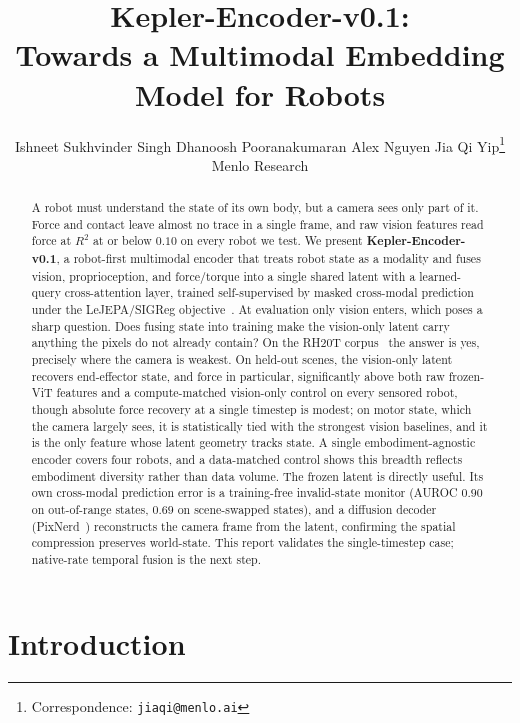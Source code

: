 \documentclass{article}
\title{Kepler-Encoder-v0.1:\\
       Towards a Multimodal Embedding Model for Robots}
\author{%
  Ishneet Sukhvinder Singh
  \And
  Dhanoosh Pooranakumaran
  \And
  Alex Nguyen
  \And
  Jia Qi Yip\thanks{Correspondence: \texttt{jiaqi@menlo.ai}} \\
  Menlo Research \\
}
\begin{document}
\maketitle


\begin{abstract}
  A robot must understand the state of its own body, but a camera sees only part of it. Force and contact leave almost no trace in a single frame, and raw vision features read force at $R^2$ at or below $0.10$ on every robot we test. We present \textbf{Kepler-Encoder-v0.1}, a robot-first multimodal encoder that treats robot state as a modality and fuses vision, proprioception, and force/torque into a single shared latent with a learned-query cross-attention layer, trained self-supervised by masked cross-modal prediction under the LeJEPA/SIGReg objective~\citep{lejepa2025}. At evaluation only vision enters, which poses a sharp question. Does fusing state into training make the vision-only latent carry anything the pixels do not already contain? On the RH20T corpus~\citep{rh20t2023} the answer is yes, precisely where the camera is weakest. On held-out scenes, the vision-only latent recovers end-effector state, and force in particular, significantly above both raw frozen-ViT features and a compute-matched vision-only control on every sensored robot, though absolute force recovery at a single timestep is modest; on motor state, which the camera largely sees, it is statistically tied with the strongest vision baselines, and it is the only feature whose latent geometry tracks state. A single embodiment-agnostic encoder covers four robots, and a data-matched control shows this breadth reflects embodiment diversity rather than data volume. The frozen latent is directly useful. Its own cross-modal prediction error is a training-free invalid-state monitor (AUROC $0.90$ on out-of-range states, $0.69$ on scene-swapped states), and a diffusion decoder (PixNerd~\citep{pixnerd2026}) reconstructs the camera frame from the latent, confirming the spatial compression preserves world-state. This report validates the single-timestep case; native-rate temporal fusion is the next step.
\end{abstract}


\section{Introduction}
\label{sec:intro}
\end{document}
